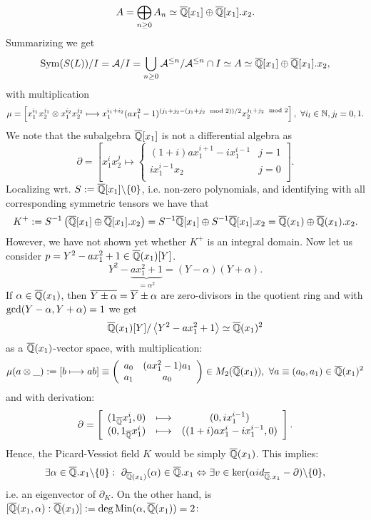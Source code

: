 $$A = \bigoplus_{n \geq 0} A_n \simeq \currfield[x_1] \oplus \currfield[x_1].x_2.$$
Summarizing we get
$$\trm{Sym}(S(L))/I = \filteredA/I = \bigcup_{n \geq 0} \filteredA^{\leq n}/  \filteredA^{\leq n} \cap I \simeq A \simeq \currfield[x_1] \oplus \currfield[x_1].x_2,$$
with multiplication
$$\mu = \left[x_1^{i_1} x_2^{j_1} \otimes x_1^{i_2} x_2^{j_2} \longmapsto x_1^{i_1 + i_2} (a x_1^2 - 1)^{(j_1 + j_2 - (j_1 + j_2 \mod 2))/2} x_2^{j_1 + j_2 \mod 2}\right],\ \forall i_l \in \nz, j_l = 0, 1.$$
We note that the subalgebra $\currfield[x_1]$ is not a differential algebra as 
$$\partial = \left[x_1^i x_2^j \longmapsto \begin{cases}
(1 + i) a x_1^{i+1} - i x_1^{i-1}& j = 1\\
i x_1^{i-1} x_2 & j = 0\\
\end{cases}\right].$$
Localizing wrt. $S := \currfield[x_1]\bsl\{0\}$, i.e. non-zero polynomials, and identifying with all corresponding symmetric tensors we have that
$$K^+ := S^{-1} \left(\currfield[x_1] \oplus \currfield[x_1].x_2\right) = S^{-1} \currfield[x_1] \oplus S^{-1} \currfield[x_1].x_2 = \currfieldx \oplus \currfieldx.x_2.$$
However, we have not shown yet whether $K^+$ is an integral domain. Now let us consider $p = Y^2 - a x_1^2 + 1 \in \currfieldx[Y]$. 
$$Y^2 - \underbrace{a x_1^2 + 1}_{= \alpha^2} = (Y - \alpha)(Y + \alpha).$$
If $\alpha \in \currfieldx$, then $\ov{Y \pm \alpha} = \ov{Y} \pm \alpha$ are zero-divisors in the quotient ring and with $\trm{gcd}(Y - \alpha, Y + \alpha) = 1$ we get
$$\currfieldx[Y]/\left<Y^2 - a x_1^2 + 1\right> \simeq \currfieldx^2$$
as a $\currfieldx$-vector space, with multiplication:
$$\mu(a \otimes \_) := [b \longmapsto a b] \equiv \left(\bao{cc}
a_0 & (a x_1^2 - 1) a_1\\
a_1 & a_0\\
\ea\right) \in M_2(\currfieldx),\ \forall a \equiv (a_0, a_1) \in \currfieldx^2$$
and with derivation:
$$\partial = \left[
\bao{ccc}
(1_{\currfield} x_1^i, 0) &\longmapsto& (0 , i x_1^{i-1})\\
(0, 1_{\currfield} x_1^i) &\longmapsto& ((1 + i) a x_1^i - i x_1^{i-1},0)\\ 
\ea
\right].$$ Hence, the Picard-Vessiot field $K$ would be simply $\currfieldx$. This implies:
$$\exists \alpha \in \currfield.x_1 \bsl \{0\}:\ \partial_{\currfieldx}(\alpha) \in \currfield.x_1 \LRA \exists v \in \ker (\alpha id_{\currfield.x_1} - \partial) \bsl\{0\},$$
i.e. an eigenvector of $\partial_K$. On the other hand, is $[\currfield(x_1,\alpha) : \currfieldx] := \deg \trm{Min}(\alpha,\currfieldx) = 2$:
